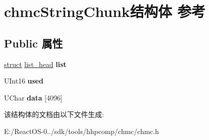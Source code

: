 \hypertarget{structchmc_string_chunk}{}\section{chmc\+String\+Chunk结构体 参考}
\label{structchmc_string_chunk}
\subsection*{Public 属性}
\begin{DoxyCompactItemize}
\item 
\mbox{\label{structchmc_string_chunk_a79f36957a00c11f015b13acff84f2a75}} 
\hyperlink{interfacestruct}{struct} \hyperlink{structlist__head}{list\+\_\+head} {\bfseries list}
\item 
\mbox{\label{structchmc_string_chunk_a8db9e6c90d37d4b6362ddd193d775f8a}} 
U\+Int16 {\bfseries used}
\item 
\mbox{\label{structchmc_string_chunk_a563ba85bc45eb05670afddfd11b881f5}} 
U\+Char {\bfseries data} \mbox{[}4096\mbox{]}
\end{DoxyCompactItemize}


该结构体的文档由以下文件生成\+:\begin{DoxyCompactItemize}
\item 
E\+:/\+React\+O\+S-\/0../sdk/tools/hhpcomp/chmc/chmc.\+h\end{DoxyCompactItemize}
